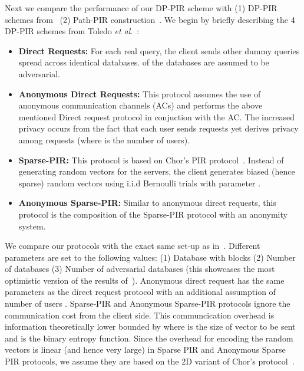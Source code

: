 \documentclass[USenglish,oneside,twocolumn]{article}
\makeatletter
\newcommand{\etal}{\textit{et al}.}
\let\origsubsection\subsection
\renewcommand\subsection{\@ifstar{\starsubsection}{\nostarsubsection}}
\newcommand\nostarsubsection[1]
{\subsectionprelude\origsubsection{#1}\subsectionpostlude}
\newcommand\starsubsection[1]
{\subsectionprelude\origsubsection*{#1}\subsectionpostlude}
\newcommand\subsectionprelude{\vspace{-1.5em}}
\newcommand\subsectionpostlude{\vspace{-1em}}
\makeatother
\begin{document}
\subsection{Comparison with Prior Work}\label{subsec:DPPIRcomparison}
Next we compare the performance of our DP-PIR scheme with (1) DP-PIR schemes from~\cite{goldbergDPPIR} (2) Path-PIR construction~\cite{mayberry2014efficient}. We begin by briefly describing the 4 DP-PIR schemes from Toledo \etal~\cite{goldbergDPPIR}:
\begin{itemize}[noitemsep, topsep=1pt]
\itemsep0em
\item \textbf{Direct Requests: }For each real query, the client sends  other dummy queries spread across  identical databases.  of the databases are assumed to be adversarial.
\item \textbf{Anonymous Direct Requests: }This protocol assumes the use of anonymous communication channels (ACs) and performs the above mentioned Direct request protocol in conjuction with the AC. The increased privacy occurs from the fact that each user sends  requests yet derives privacy among  requests (where  is the number of users).
\item \textbf{Sparse-PIR: }This protocol is based on Chor's PIR protocol~\cite{chor}. Instead of generating random vectors for the servers, the client generates biased (hence sparse) random vectors using i.i.d Bernoulli trials with parameter . 
\item \textbf{Anonymous Sparse-PIR: }Similar to anonymous direct requests, this protocol is the composition of the Sparse-PIR protocol with an anonymity system.\\
\end{itemize}

We compare our protocols with the exact same set-up as in~\cite{goldbergDPPIR}. Different parameters are set to the following values: (1) Database with  blocks (2) Number of databases  (3) Number of adversarial databases  (this showcases the most optimistic version of the results of~\cite{goldbergDPPIR}). Anonymous direct request has the same parameters as the direct request protocol with an additional assumption of number of users . Sparse-PIR and Anonymous Sparse-PIR protocols ignore the communication cost from the client side. This communcication overhead is information theoretically lower bounded by  where  is the size of vector to be sent and  is the binary entropy function. Since the overhead for encoding the random vectors is linear (and hence very large) in Sparse PIR and Anonymous Sparse PIR protocols, we assume they are based on the 2D variant of Chor's protocol~\cite{chor}. 
\end{document}
